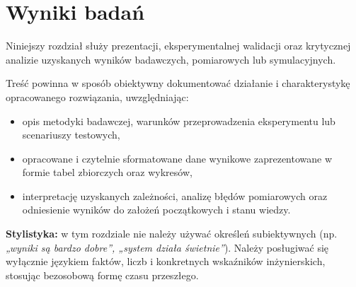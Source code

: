  
 \chapter{Wyniki badań}
 \label{ch:wyniki} %
 
 Niniejszy rozdział służy prezentacji, eksperymentalnej walidacji oraz krytycznej analizie uzyskanych wyników badawczych, pomiarowych lub symulacyjnych. 
 
Treść powinna w sposób obiektywny dokumentować działanie i charakterystykę opracowanego rozwiązania, uwzględniając:
 \begin{itemize}
 	\item opis metodyki badawczej, warunków przeprowadzenia eksperymentu lub scenariuszy testowych,
 	
 	\item opracowane i czytelnie sformatowane dane wynikowe zaprezentowane w formie tabel zbiorczych oraz wykresów,
 	
 	\item interpretację uzyskanych zależności, analizę błędów pomiarowych oraz odniesienie wyników do założeń początkowych i stanu wiedzy.
 \end{itemize}
 \noindent \textbf{Stylistyka:} w tym rozdziale nie należy używać określeń subiektywnych (np. \textit{„wyniki są bardzo dobre”, „system działa świetnie”}). Należy posługiwać się wyłącznie językiem faktów, liczb i konkretnych wskaźników inżynierskich, stosując bezosobową formę czasu przeszłego.

